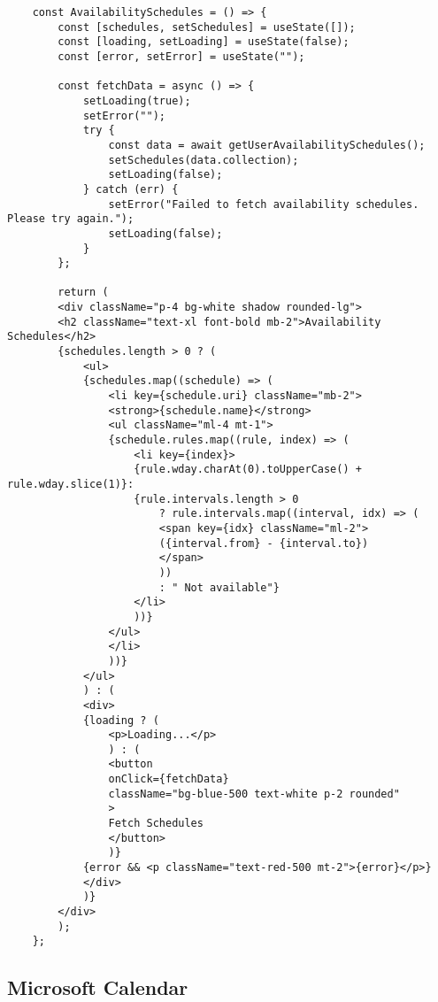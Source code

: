 \begin{verbatim}
    const AvailabilitySchedules = () => {
        const [schedules, setSchedules] = useState([]);
        const [loading, setLoading] = useState(false);
        const [error, setError] = useState("");
        
        const fetchData = async () => {
            setLoading(true);
            setError("");
            try {
                const data = await getUserAvailabilitySchedules();
                setSchedules(data.collection);
                setLoading(false);
            } catch (err) {
                setError("Failed to fetch availability schedules. Please try again.");
                setLoading(false);
            }
        };
        
        return (
        <div className="p-4 bg-white shadow rounded-lg">
        <h2 className="text-xl font-bold mb-2">Availability Schedules</h2>
        {schedules.length > 0 ? (
            <ul>
            {schedules.map((schedule) => (
                <li key={schedule.uri} className="mb-2">
                <strong>{schedule.name}</strong>
                <ul className="ml-4 mt-1">
                {schedule.rules.map((rule, index) => (
                    <li key={index}>
                    {rule.wday.charAt(0).toUpperCase() + rule.wday.slice(1)}:
                    {rule.intervals.length > 0
                        ? rule.intervals.map((interval, idx) => (
                        <span key={idx} className="ml-2">
                        ({interval.from} - {interval.to})
                        </span>
                        ))
                        : " Not available"}
                    </li>
                    ))}
                </ul>
                </li>
                ))}
            </ul>
            ) : (
            <div>
            {loading ? (
                <p>Loading...</p>
                ) : (
                <button
                onClick={fetchData}
                className="bg-blue-500 text-white p-2 rounded"
                >
                Fetch Schedules
                </button>
                )}
            {error && <p className="text-red-500 mt-2">{error}</p>}
            </div>
            )}
        </div>
        );
    };
\end{verbatim}

\subsection{Microsoft Calendar}

